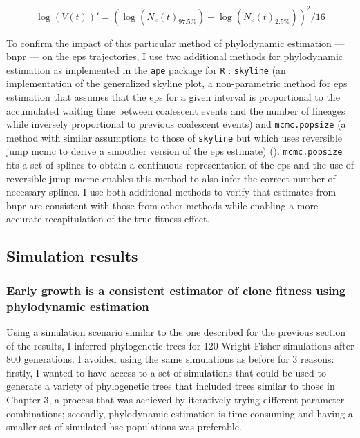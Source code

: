 \begin{equation}\label{eq:var-bnpr}
	\log(V(t))' = (\log(N_e(t)_{97.5\%}) - \log(N_e(t)_{2.5\%}))^2/16
\end{equation}

To confirm the impact of this particular method of phylodynamic estimation --- \ac{bnpr} --- on the \ac{eps} trajectories, I use two additional methods for phylodynamic estimation as implemented in the \texttt{ape} package for \texttt{R} \cite{Paradis2019-na}: \texttt{skyline} (an implementation of the generalized skyline plot, a non-parametric method for \ac{eps} estimation that assumes that the \ac{eps} for a given interval is proportional to the accumulated waiting time between coalescent events and the number of lineages while inversely proportional to previous coalescent events) and \texttt{mcmc.popsize} (a method with similar assumptions to those of \texttt{skyline} but which uses reversible jump \ac{mcmc} to derive a smoother version of the \ac{eps} estimate) \cite{Opgen-Rhein2005-pi} (). \texttt{mcmc.popsize} fits a set of splines to obtain a continuous representation of the \ac{eps} and the use of reversible jump \ac{mcmc} enables this method to also infer the correct number of necessary splines. I use both additional methods to verify that estimates from \ac{bnpr} are consistent with those from other methods while enabling a more accurate recapitulation of the true fitness effect.

\begin{figure}[!ht]
	\label{fig:examples-phylo-traj}
\end{figure}

\subsection{Simulation results}

\subsubsection{Early growth is a consistent estimator of clone fitness using phylodynamic estimation}

Using a simulation scenario similar to the one described for the previous section of the results, I inferred phylogenetic trees for 120 Wright-Fisher simulations after 800 generations. I avoided using the same simulations as before for 3 reasons: firstly, I wanted to have access to a set of simulations that could be used to generate a variety of phylogenetic trees that included trees similar to those in Chapter 3, a process that was achieved by iteratively trying different parameter combinations; secondly, phylodynamic estimation is time-consuming and having a smaller set of simulated \ac{hsc} populations was preferable.

